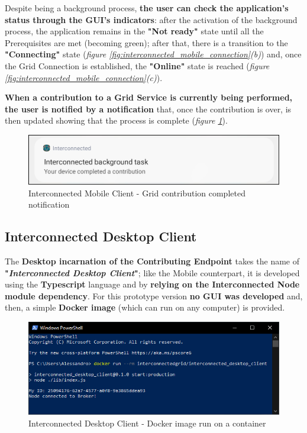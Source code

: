 Despite being a background process, \textbf{the user can check the application's status through the GUI's indicators}: after the activation of the background process, the application remains in the \textbf{"Not ready"} state until all the Prerequisites are met (becoming green); after that, there is a transition to the \textbf{"Connecting"} state (\textit{figure \ref{fig:interconnected_mobile_connection}(b)}) and, once the Grid Connection is established, the \textbf{"Online"} state is reached (\textit{figure \ref{fig:interconnected_mobile_connection}(c)}).

\textbf{When a contribution to a Grid Service is currently being performed, the user is notified by a notification} that, once the contribution is over, is then updated showing that the process is complete (\textit{figure \ref{fig:notification_completed}}).

\begin{figure}[!ht]
    \centering
    \includegraphics[scale=0.35]{document/chapters/chapter_7/images/notification_completed.png}
    \caption{Interconnected Mobile Client - Grid contribution completed notification}
    \label{fig:notification_completed}
\end{figure}

\subsection{Interconnected Desktop Client}
The \textbf{Desktop incarnation of the Contributing Endpoint} takes the name of \textbf{"\textit{Interconnected Desktop Client}"}; like the Mobile counterpart, it is developed using the \textbf{Typescript} language and by \textbf{relying on the Interconnected Node module dependency}. For this prototype version \textbf{no GUI was developed} and, then, a simple \textbf{Docker image} (which can run on any computer) is provided.

\begin{figure}[!ht]
    \centering
    \includegraphics[scale=0.8]{document/chapters/chapter_7/images/interconnected_desktop.png}
    \caption{Interconnected Desktop Client - Docker image run on a container}
    \label{fig:interconnected_desktop}
\end{figure}

